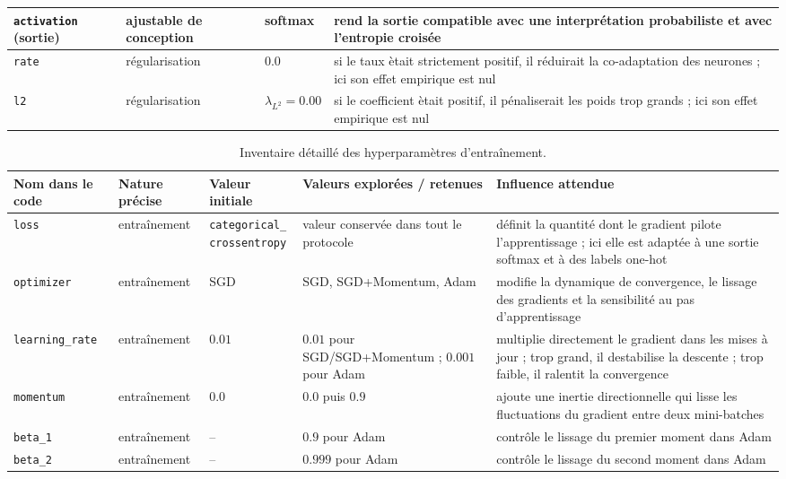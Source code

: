 \begin{table}[t]
\begin{tabular}{|p{2.6cm}|p{3.5cm}|p{3.1cm}|p{6.9cm}|}
\hline
\texttt{activation} (sortie) & ajustable de conception & softmax & rend la sortie compatible avec une interpr\'etation probabiliste et avec l'entropie crois\'ee \\
\hline
\texttt{rate} & r\'egularisation & $0.0$ & si le taux \`etait strictement positif, il r\'eduirait la co-adaptation des neurones ; ici son effet empirique est nul \\
\hline
\texttt{l2} & r\'egularisation & $\lambda_{L^2}=0.00$ & si le coefficient \`etait positif, il p\'enaliserait les poids trop grands ; ici son effet empirique est nul \\
\hline
\end{tabular}
\end{table}

\begin{table}[t]
\centering
\caption{Inventaire d\'etaill\'e des hyperparam\`etres d'entra\^inement.}
\label{tab:section5_training_inventory}
\scriptsize
\begin{tabular}{|p{2.2cm}|p{2.7cm}|p{2.5cm}|p{3.7cm}|p{5.5cm}|}
\hline
Nom dans le code & Nature pr\'ecise & Valeur initiale & Valeurs explor\'ees / retenues & Influence attendue \\
\hline
\texttt{loss} & entra\^inement & \shortstack[l]{\texttt{categorical\_}\\\texttt{crossentropy}} & valeur conserv\'ee dans tout le protocole & d\'efinit la quantit\'e dont le gradient pilote l'apprentissage ; ici elle est adapt\'ee \`a une sortie softmax et \`a des labels one-hot \\
\hline
\texttt{optimizer} & entra\^inement & SGD & SGD, SGD+Momentum, Adam & modifie la dynamique de convergence, le lissage des gradients et la sensibilit\'e au pas d'apprentissage \\
\hline
\texttt{learning\_rate} & entra\^inement & $0.01$ & $0.01$ pour SGD/SGD+Momentum ; $0.001$ pour Adam & multiplie directement le gradient dans les mises \`a jour ; trop grand, il destabilise la descente ; trop faible, il ralentit la convergence \\
\hline
\texttt{momentum} & entra\^inement & $0.0$ & $0.0$ puis $0.9$ & ajoute une inertie directionnelle qui lisse les fluctuations du gradient entre deux mini-batches \\
\hline
\texttt{beta\_1} & entra\^inement & -- & $0.9$ pour Adam & contr\^ole le lissage du premier moment dans Adam \\
\hline
\texttt{beta\_2} & entra\^inement & -- & $0.999$ pour Adam & contr\^ole le lissage du second moment dans Adam \\

\end{tabular}
\end{table}
